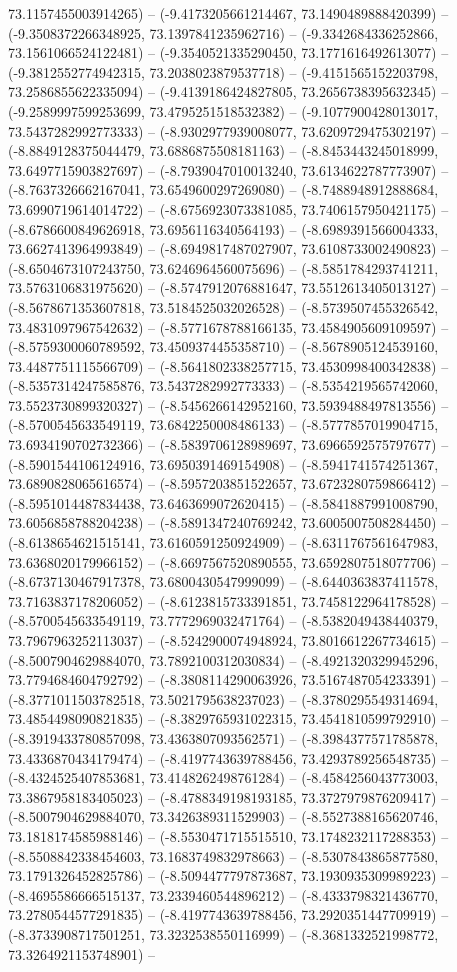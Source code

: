 73.1157455003914265) -- (-9.4173205661214467, 73.1490489888420399) -- (-9.3508372266348925, 73.1397841235962716) -- (-9.3342684336252866, 73.1561066524122481) -- (-9.3540521335290450, 73.1771616492613077) -- (-9.3812552774942315, 73.2038023879537718) -- (-9.4151565152203798, 73.2586855622335094) -- (-9.4139186424827805, 73.2656738395632345) -- (-9.2589997599253699, 73.4795251518532382) -- (-9.1077900428013017, 73.5437282992773333) -- (-8.9302977939008077, 73.6209729475302197) -- (-8.8849128375044479, 73.6886875508181163) -- (-8.8453443245018999, 73.6497715903827697) -- (-8.7939047010013240, 73.6134622787773907) -- (-8.7637326662167041, 73.6549600297269080) -- (-8.7488948912888684, 73.6990719614014722) -- (-8.6756923073381085, 73.7406157950421175) -- (-8.6786600849626918, 73.6956116340564193) -- (-8.6989391566004333, 73.6627413964993849) -- (-8.6949817487027907, 73.6108733002490823) -- (-8.6504673107243750, 73.6246964560075696) -- (-8.5851784293741211, 73.5763106831975620) -- (-8.5747912076881647, 73.5512613405013127) -- (-8.5678671353607818, 73.5184525032026528) -- (-8.5739507455326542, 73.4831097967542632) -- (-8.5771678788166135, 73.4584905609109597) -- (-8.5759300060789592, 73.4509374455358710) -- (-8.5678905124539160, 73.4487751115566709) -- (-8.5641802338257715, 73.4530998400342838) -- (-8.5357314247585876, 73.5437282992773333) -- (-8.5354219565742060, 73.5523730899320327) -- (-8.5456266142952160, 73.5939488497813556) -- (-8.5700545633549119, 73.6842250008486133) -- (-8.5777857019904715, 73.6934190702732366) -- (-8.5839706128989697, 73.6966592575797677) -- (-8.5901544106124916, 73.6950391469154908) -- (-8.5941741574251367, 73.6890828065616574) -- (-8.5957203851522657, 73.6723280759866412) -- (-8.5951014487834438, 73.6463699072620415) -- (-8.5841887991008790, 73.6056858788204238) -- (-8.5891347240769242, 73.6005007508284450) -- (-8.6138654621515141, 73.6160591250924909) -- (-8.6311767561647983, 73.6368020179966152) -- (-8.6697567520890555, 73.6592807518077706) -- (-8.6737130467917378, 73.6800430547999099) -- (-8.6440363837411578, 73.7163837178206052) -- (-8.6123815733391851, 73.7458122964178528) -- (-8.5700545633549119, 73.7772969032471764) -- (-8.5382049438440379, 73.7967963252113037) -- (-8.5242900074948924, 73.8016612267734615) -- (-8.5007904629884070, 73.7892100312030834) -- (-8.4921320329945296, 73.7794684604792792) -- (-8.3808114290063926, 73.5167487054233391) -- (-8.3771011503782518, 73.5021795638237023) -- (-8.3780295549314694, 73.4854498090821835) -- (-8.3829765931022315, 73.4541810599792910) -- (-8.3919433780857098, 73.4363807093562571) -- (-8.3984377571785878, 73.4336870434179474) -- (-8.4197743639788456, 73.4293789256548735) -- (-8.4324525407853681, 73.4148262498761284) -- (-8.4584256043773003, 73.3867958183405023) -- (-8.4788349198193185, 73.3727979876209417) -- (-8.5007904629884070, 73.3426389311529903) -- (-8.5527388165620746, 73.1818174585988146) -- (-8.5530471715515510, 73.1748232117288353) -- (-8.5508842338454603, 73.1683749832978663) -- (-8.5307843865877580, 73.1791326452825786) -- (-8.5094477797873687, 73.1930935309989223) -- (-8.4695586666515137, 73.2339460544896212) -- (-8.4333798321436770, 73.2780544577291835) -- (-8.4197743639788456, 73.2920351447709919) -- (-8.3733908717501251, 73.3232538550116999) -- (-8.3681332521998772, 73.3264921153748901) -- 